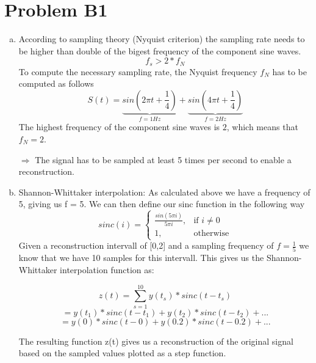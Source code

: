 \documentclass[12pt]{article}
\begin{document}
\lstset{language=C++}


\section*{Problem B1}
\begin{enumerate}[a)]
	\item According to sampling theory (Nyquist criterion) the sampling rate needs to be higher than double of the bigest frequency of the component sine waves.
	$$ f_s > 2 * f_N$$
	To compute the necessary sampling rate, the Nyquist frequency $f_N$ has to be computed as follows
	$$ S(t) = \underbrace{sin(2\pi t + \frac{1}{4})}_{f = 1Hz} + \underbrace{sin(4\pi t + \frac{1}{4})}_{f = 2Hz}$$
	The highest frequency of the component sine waves is $2$, which means that $f_N = 2$.

	$\Rightarrow$ The signal has to be sampled at least 5 times per second to enable a reconstruction.

	\item Shannon-Whittaker interpolation:
	As calculated above we have a frequency of 5, giving us f = 5.
	We can then define our sinc function in the following way
	\[
    		sinc(i)=
		\begin{cases}
    			 \frac{sin(5{\pi}i)}{5{\pi}i},& \text{if } i\neq 0\\
    			1,              & \text{otherwise}
		\end{cases}
	\]
    Given a reconstruction intervall of [0,2] and a sampling frequency of $f=\frac{1}{5}$ we know that we have 10 samples for this intervall. This gives us the Shannon-Whittaker interpolation function as:

	$$z(t) = \sum_{s=1}^{10} y(t_s) * sinc(t-t_s)$$
	$$=  y(t_1) * sinc(t-t_1) + y(t_2) * sinc(t-t_2) + ...$$
	$$=  y(0) * sinc(t-0) + y(0.2) * sinc(t-0.2) + ...$$

The resulting function {z(t)} gives us a reconstruction of the original signal based on the sampled values plotted as a step function.\\



\end{enumerate}
\end{document}
